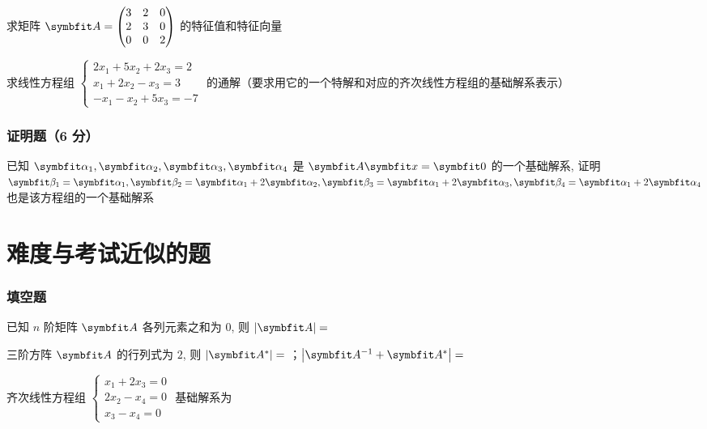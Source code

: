 \begin{ti}[13 分]
	求矩阵 $\bA = \begin{pmatrix}
		3 & 2 & 0 \\
		2 & 3 & 0 \\
		0 & 0 & 2
	\end{pmatrix}$ 的特征值和特征向量
\end{ti}

\begin{ti}[12 分]
	求线性方程组 $\begin{cases}
		2x_{1} + 5x_{2} + 2x_{3} = 2 \\
		x_{1} + 2x_{2} - x_{3} = 3 \\
		-x_{1} - x_{2} + 5x_{3} = -7
	\end{cases}$ 的通解（要求用它的一个特解和对应的齐次线性方程组的基础解系表示）
\end{ti}

\subsubsection{证明题（6 分）}
已知 $\balpha_{1},\balpha_{2},\balpha_{3},\balpha_{4}$ 是 $\bA \symbfit x = \symbfit 0$ 的一个基础解系, 证明 $\bbeta_{1} = \balpha_{1}, \bbeta_{2} = \balpha_{1} + 2\balpha_{2}, \bbeta_{3} = \balpha_{1} + 2\balpha_{3}, \bbeta_{4} = \balpha_{1} + 2\balpha_{4}$ 也是该方程组的一个基础解系

\section{难度与考试近似的题}
\subsubsection{填空题}
\begin{ti}
	已知 $n$ 阶矩阵 $\bA$ 各列元素之和为 $0$, 则 $|\bA| = $ \hua
\end{ti}

\begin{ti}
	三阶方阵 $\bA$ 的行列式为 $2$, 则 $|\bA^{\astt}| = $ \hua{}；$\bigl|\bA^{-1} + \bA^{\astt}\bigr| = $ \hua
\end{ti}

\begin{ti}
	齐次线性方程组 $\begin{cases}
		x_{1} + 2x_{3} = 0 \\
		2x_{2} - x_{4} = 0 \\
		x_{3} - x_{4} = 0
	\end{cases}$ 基础解系为 \hua
\end{ti}

